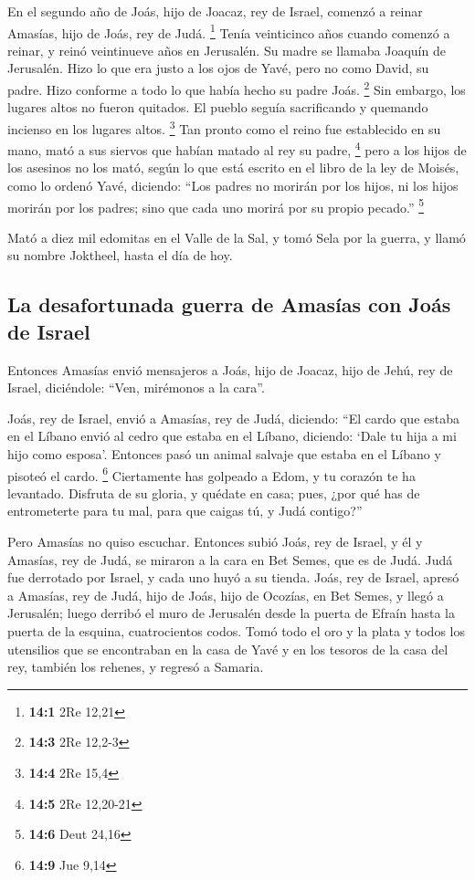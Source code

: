 \begin{paracol}{2}
 En el segundo año de Joás, hijo de Joacaz, rey de Israel,
comenzó a reinar Amasías, hijo de Joás, rey de Judá. \footnote{\textbf{14:1}
  2Re 12,21}  Tenía veinticinco años cuando comenzó a
reinar, y reinó veintinueve años en Jerusalén. Su madre se llamaba
Joaquín de Jerusalén.  Hizo lo que era justo a los ojos de
Yavé, pero no como David, su padre. Hizo conforme a todo lo que había
hecho su padre Joás. \footnote{\textbf{14:3} 2Re 12,2-3} 
Sin embargo, los lugares altos no fueron quitados. El pueblo seguía
sacrificando y quemando incienso en los lugares altos. \footnote{\textbf{14:4}
  2Re 15,4}  Tan pronto como el reino fue establecido en
su mano, mató a sus siervos que habían matado al rey su padre,
\footnote{\textbf{14:5} 2Re 12,20-21}  pero a los hijos de
los asesinos no los mató, según lo que está escrito en el libro de la
ley de Moisés, como lo ordenó Yavé, diciendo: ``Los padres no morirán
por los hijos, ni los hijos morirán por los padres; sino que cada uno
morirá por su propio pecado.'' \footnote{\textbf{14:6} Deut 24,16}

 Mató a diez mil edomitas en el Valle de la Sal, y tomó
Sela por la guerra, y llamó su nombre Joktheel, hasta el día de hoy.

\hypertarget{la-desafortunada-guerra-de-amasuxedas-con-jouxe1s-de-israel}{%
\subsection{La desafortunada guerra de Amasías con Joás de
Israel}\label{la-desafortunada-guerra-de-amasuxedas-con-jouxe1s-de-israel}}

 Entonces Amasías envió mensajeros a Joás, hijo de Joacaz,
hijo de Jehú, rey de Israel, diciéndole: ``Ven, mirémonos a la cara''.

 Joás, rey de Israel, envió a Amasías, rey de Judá,
diciendo: ``El cardo que estaba en el Líbano envió al cedro que estaba
en el Líbano, diciendo: `Dale tu hija a mi hijo como esposa'. Entonces
pasó un animal salvaje que estaba en el Líbano y pisoteó el cardo.
\footnote{\textbf{14:9} Jue 9,14}  Ciertamente has
golpeado a Edom, y tu corazón te ha levantado. Disfruta de su gloria, y
quédate en casa; pues, ¿por qué has de entrometerte para tu mal, para
que caigas tú, y Judá contigo?''

 Pero Amasías no quiso escuchar. Entonces subió Joás, rey
de Israel, y él y Amasías, rey de Judá, se miraron a la cara en Bet
Semes, que es de Judá.  Judá fue derrotado por Israel, y
cada uno huyó a su tienda.  Joás, rey de Israel, apresó a
Amasías, rey de Judá, hijo de Joás, hijo de Ocozías, en Bet Semes, y
llegó a Jerusalén; luego derribó el muro de Jerusalén desde la puerta de
Efraín hasta la puerta de la esquina, cuatrocientos codos.
 Tomó todo el oro y la plata y todos los utensilios que
se encontraban en la casa de Yavé y en los tesoros de la casa del rey,
también los rehenes, y regresó a Samaria.


\end{paracol}
